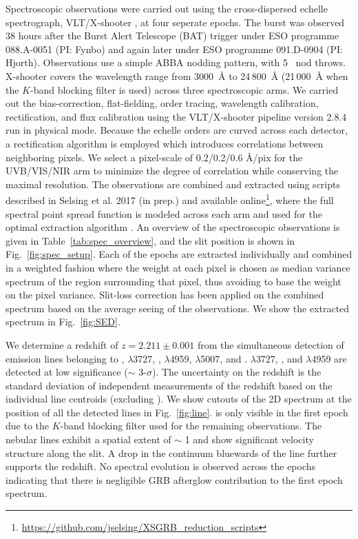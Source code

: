 \documentclass{aa}    %
\begin{document}
Spectroscopic observations were carried out using the cross-dispersed echelle
spectrograph, VLT/X-shooter \citep{Vernet2011}, at four seperate epochs. The
burst was observed 38 hours after the Burst Alert Telescope (BAT) trigger under
ESO programme 088.A-0051 (PI: Fynbo) and again later under ESO programme
091.D-0904 (PI: Hjorth). Observations use a simple ABBA nodding pattern, with 5
\arcsec~nod throws. X-shooter covers the wavelength range from 3000~\AA{} to
24\,800~\AA{} (21\,000~\AA{} when the $K$-band blocking filter is used) across
three spectroscopic arms. We carried out the bias-correction, flat-fielding,
order tracing, wavelength calibration, rectification, and flux calibration using
the VLT/X-shooter pipeline version 2.8.4 \citep{Goldoni2006, Modigliani2010} run
in physical mode. Because the echelle orders are curved across each detector, a
rectification algorithm is employed which introduces correlations between
neighboring pixels. We select a pixel-scale of 0.2/0.2/0.6 \AA/pix for the
UVB/VIS/NIR arm to minimize the degree of correlation while conserving the
maximal resolution. The observations are combined and extracted using scripts
described in Selsing et al. 2017 (in prep.) and available
online\footnote{\url{https://github.com/jselsing/XSGRB_reduction_scripts}},
where the full spectral point spread function is modeled across each arm and
used for the optimal extraction algorithm \citep{Horne1986}. An overview of the
spectroscopic observations is given in Table~\ref{tab:spec_overview}, and the
slit position is shown in Fig.~\ref{fig:spec_setup}. Each of the epochs are
extracted individually and combined in a weighted fashion where the weight at
each pixel is chosen as median variance spectrum of the region surrounding that
pixel, thus avoiding to base the weight on the pixel variance. Slit-loss
correction has been applied on the combined spectrum based on the average seeing
of the observations. We show the extracted spectrum in Fig.~\ref{fig:SED}.



We determine a redshift of $z = 2.211 \pm 0.001$ from the simultaneous detection
of emission lines belonging to \lya, \oii$\lambda$3727, \hb, \oiii$\lambda$4959,
\oiii$\lambda$5007, and \ha. \oii$\lambda$3727, \hb{}, and \oiii$\lambda$4959
are detected at low significance ($\sim$ 3-$\sigma$). The uncertainty on the
redshift is the standard deviation of independent measurements of the redshift
based on the individual line centroids (excluding \lya). We show cutouts of the
2D spectrum at the position of all the detected lines in Fig.~\ref{fig:line}. 
\ha{} is only visible in the first epoch due to the $K$-band blocking filter
used for the remaining observations. The nebular lines exhibit a spatial extent
of $\sim$ 1 and show significant velocity structure along the slit. A drop
in the continuum bluewards of the \lya{} line further supports the redshift. No
spectral evolution is observed across the epochs indicating that there is
negligible GRB afterglow contribution to the first epoch spectrum.
\end{document}
